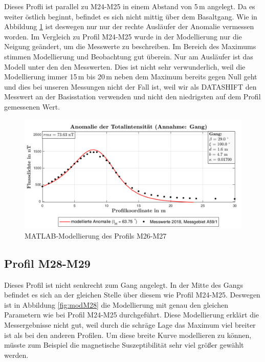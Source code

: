 Dieses Profli ist parallel zu M24-M25 in einem Abstand von 5\,m angelegt. Da es weiter östlich beginnt, befindet es sich nicht mittig über dem Basaltgang. Wie in Abbildung \ref{fig:modM26} ist deswegen nur nur der rechte Ausläufer der Anomalie vermessen worden. Im Vergleich zu Profil M24-M25 wurde in der Modellierung nur die Neigung geändert, um die Messwerte zu beschreiben. Im Bereich des Maximums stimmen Modellierung und Beobachtung gut überein. Nur am Ausläufer ist das Modell unter den den Messwerten. Dies ist nicht sehr verwunderlich, weil die Modellierung immer 15\,m bis 20\,m neben dem Maximum bereits gegen Null geht und dies bei unseren Messungen nicht der Fall ist, weil wir als DATASHIFT den Messwert an der Basisstation verwenden und nicht den niedrigsten auf dem Profil gemessenen Wert.

\begin{figure}
 \centering
 \includegraphics[width=\textwidth]{fig/modM26}
 \caption{MATLAB-Modellierung des Profils M26-M27}
 \label{fig:modM26}
\end{figure}

\subsection{Profil M28-M29}

Dieses Profil ist nicht senkrecht zum Gang angelegt. In der Mitte des Gangs befindet es sich an der gleichen Stelle über diesem wie Profil M24-M25. Deswegen ist in Abbildung \ref{fig:modM28} die Modellierung mit genau den gleichen Parametern wie bei Profil M24-M25 durchgeführt. Diese Modellierung erklärt die Messergebnisse nicht gut, weil durch die schräge Lage das Maximum viel breiter ist als bei den anderen Profilen. Um diese breite Kurve modellieren zu können, müsste zum Beispiel die magnetische Suszeptibilität sehr viel größer gewählt werden.

